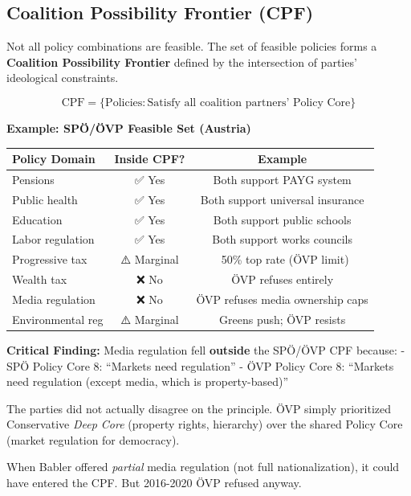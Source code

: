 \subsection{Coalition Possibility Frontier (CPF)}

Not all policy combinations are feasible. The set of feasible policies forms a \textbf{Coalition Possibility Frontier} defined by the intersection of parties' ideological constraints.

\begin{equation}
\text{CPF} = \{ \text{Policies} : \text{Satisfy all coalition partners' Policy Core}\}
\end{equation}

\textbf{Example: SPÖ/ÖVP Feasible Set (Austria)}

\begin{table}[h]
\centering
\small
\renewcommand{\arraystretch}{1.3}
\begin{tabular}{@{}lcc@{}}
\toprule
\textbf{Policy Domain} & \textbf{Inside CPF?} & \textbf{Example} \\
\midrule
Pensions & ✅ Yes & Both support PAYG system \\
Public health & ✅ Yes & Both support universal insurance \\
Education & ✅ Yes & Both support public schools \\
Labor regulation & ✅ Yes & Both support works councils \\
Progressive tax & ⚠️ Marginal & ~50\% top rate (ÖVP limit) \\
Wealth tax & ❌ No & ÖVP refuses entirely \\
Media regulation & ❌ No & ÖVP refuses media ownership caps \\
Environmental reg & ⚠️ Marginal & Greens push; ÖVP resists \\
\bottomrule
\end{tabular}
\end{table}

\textbf{Critical Finding:} Media regulation fell \textbf{outside} the SPÖ/ÖVP CPF because:
- SPÖ Policy Core 8: ``Markets need regulation''
- ÖVP Policy Core 8: ``Markets need regulation (except media, which is property-based)''

The parties did not actually disagree on the principle. ÖVP simply prioritized Conservative \textit{Deep Core} (property rights, hierarchy) over the shared Policy Core (market regulation for democracy).

When Babler offered \textit{partial} media regulation (not full nationalization), it could have entered the CPF. But 2016-2020 ÖVP refused anyway.

